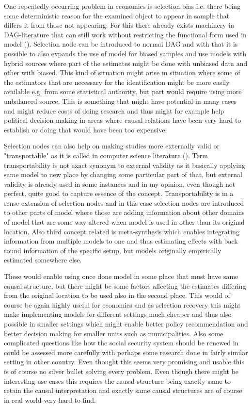 \documentclass[main=english,12pt,a4paper,pdftex,econ,utf8]{aaltothesis}
\begin{document}
One repeatedly occurring problem in economics is selection bias i.e. there being some deterministic reason for the examined object to appear in sample that differs it from those not appearing. For this there already exists machinery in DAG-literature that can still work without restricting the functional form used in model (\cite{Bareinboim2014}). Selection node can be introduced to normal DAG and with that it is possible to also expands the use of model for biased samples and use models with hybrid sources where part of the estimates might be done with unbiased data and other with biased. This kind of situation might arise in situation where some of the estimators that are necessary for the identification might be more easily available e.g. from some statistical authority, but part would require using more unbalanced source. This is something that might have potential in many cases and might reduce costs of doing research and thus might for example help political decision making in areas where causal relations have been very hard to establish or doing that would have been too expensive.

Selection nodes can also help on making studies more externally valid or "transportable" as it is called in computer science literature (\cite{Pearl2011}). Term transportability is not exact synonym to external validity as it basically applying same model to new place by changing some particular part of that, but external validity is already used in some instances and in my opinion, even though not perfect, quite good to capture essence of the concept. Transportability is in a sense extension of selection nodes and in this case selection nodes are introduced to other parts of model where those are adding information about other domains of model that are some way altered when model is used in other than its original location. Also third concept related is meta-synthesis which enables integrating information from multiple models to one and thus estimating effects with back round information of the specific setup, but models originally empirically estimated somewhere else.

These would enable using once done model in some place that must have same causal structure, but there might be some factors affecting the estimates differing from the original location to be used also in the second place. This would of course be again highly useful for economics and as selection recovery this might make implementing models for different settings much cheaper and thus also possible in smaller settings which might enable better policy recommendation and better decision making for smaller units such as municipalities. Also some complicated questions like how the social security system should be renewed in could be assessed more carefully with perhaps some research done in fairly similar setting in other country. Even thought this seems very promising and usable this is of course no silver bullet solving every problem. Even though there might be interesting use cases this requires the causal structure being exactly same to retain the causal interpretation and exactly same causal structures are of course in real world very hard to find.
\end{document}
